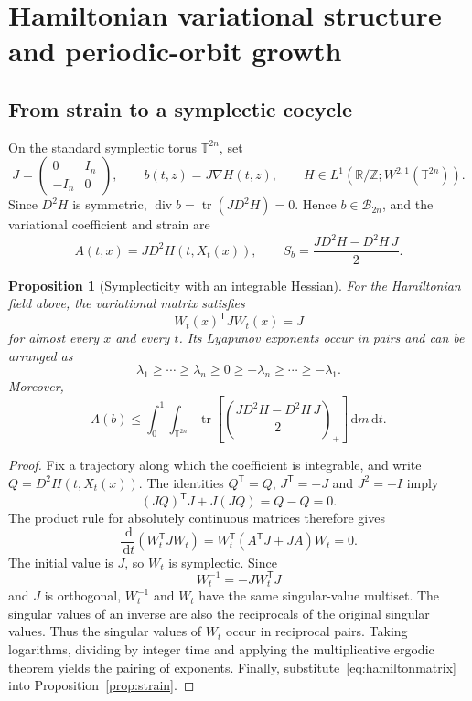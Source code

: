 \documentclass[review,12pt,times,a4paper,nopreprintline]{elsarticle}
\theoremstyle{plain}
\newtheorem{proposition}[theorem]{Proposition}
\theoremstyle{definition}
\theoremstyle{remark}
\newcommand{\T}{\mathbb T}
\newcommand{\R}{\mathbb R}
\newcommand{\Z}{\mathbb Z}
\newcommand{\B}{\mathscr B}
\newcommand{\dd}{\,\mathrm d}
\newcommand{\tr}{\operatorname{tr}}
\newcommand{\diver}{\operatorname{div}}
\numberwithin{equation}{section}
\begin{document}
\section{Hamiltonian variational structure and periodic-orbit growth}\label{sec:Hamilton}

\subsection{From strain to a symplectic cocycle}
On the standard symplectic torus $\T^{2n}$, set
\[
 J=\begin{pmatrix}0&I_n\\-I_n&0\end{pmatrix},\qquad
 b(t,z)=J\nabla H(t,z),\qquad
 H\in L^1(\R/\Z;W^{2,1}(\T^{2n})).
\]
Since $D^2H$ is symmetric, $\diver b=\tr(JD^2H)=0$. Hence $b\in\B_{2n}$, and the variational coefficient and strain are
\begin{equation}\label{eq:hamiltonmatrix}
 A(t,x)=JD^2H(t,X_t(x)),\qquad
 S_b=\frac{JD^2H-D^2H\,J}{2}.
\end{equation}

\begin{proposition}[Symplecticity with an integrable Hessian]\label{prop:symplectic}
For the Hamiltonian field above, the variational matrix satisfies
\[
 W_t(x)^{\mathsf T}JW_t(x)=J
\]
for almost every $x$ and every $t$. Its Lyapunov exponents occur in pairs and can be arranged as
\[
 \lambda_1\geq\cdots\geq\lambda_n\geq0
 \geq-\lambda_n\geq\cdots\geq-\lambda_1.
\]
Moreover,
\begin{equation}\label{eq:hamiltonbudget}
 \Lambda(b)\leq
 \int_0^1\!\int_{\T^{2n}}
 \tr\!\left[\left(\frac{JD^2H-D^2H\,J}{2}\right)_+\right]\dd m\dd t.
\end{equation}
\end{proposition}
\begin{proof}
Fix a trajectory along which the coefficient is integrable, and write $Q=D^2H(t,X_t(x))$. The identities $Q^{\mathsf T}=Q$, $J^{\mathsf T}=-J$ and $J^2=-I$ imply
\[
 (JQ)^{\mathsf T}J+J(JQ)=Q-Q=0.
\]
The product rule for absolutely continuous matrices therefore gives
\[
 \frac{\dd}{\dd t}(W_t^{\mathsf T}JW_t)
 =W_t^{\mathsf T}(A^{\mathsf T}J+JA)W_t=0.
\]
The initial value is $J$, so $W_t$ is symplectic. Since
\[
 W_t^{-1}=-JW_t^{\mathsf T}J
\]
and $J$ is orthogonal, $W_t^{-1}$ and $W_t$ have the same singular-value multiset. The singular values of an inverse are also the reciprocals of the original singular values. Thus the singular values of $W_t$ occur in reciprocal pairs. Taking logarithms, dividing by integer time and applying the multiplicative ergodic theorem yields the pairing of exponents. Finally, substitute~\eqref{eq:hamiltonmatrix} into Proposition~\ref{prop:strain}.
\end{proof}
\end{document}
